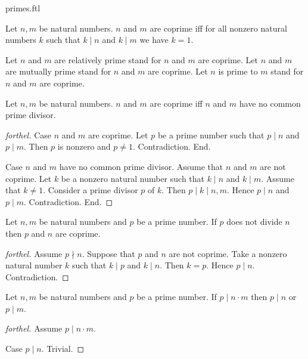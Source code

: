 \documentclass{naproche-library}
\begin{document}
\begin{smodule}[title=Prime Numbers]{primes.ftl}
\begin{definition}[forthel,id=ARITHMETIC_10_463197419077632]
  Let $n, m$ be natural numbers.
  $n$ and $m$ are coprime iff for all nonzero natural numbers $k$ such that $k \mid n$ and $k \mid m$ we have $k = 1$.

  Let $n$ and $m$ are relatively prime stand for $n$ and $m$ are coprime.
  Let $n$ and $m$ are mutually prime stand for $n$ and $m$ are coprime.
  Let $n$ is prime to $m$ stand for $n$ and $m$ are coprime.
\end{definition}

\begin{proposition}[forthel,id=ARITHMETIC_10_5776394594287616]
  Let $n, m$ be natural numbers.
  $n$ and $m$ are coprime iff $n$ and $m$ have no common prime divisor.
\end{proposition}
\begin{proof}[forthel]
  Case $n$ and $m$ are coprime.
    Let $p$ be a prime number such that $p \mid n$ and $p \mid m$.
    Then $p$ is nonzero and $p \neq 1$.
    Contradiction.
  End.

  Case $n$ and $m$ have no common prime divisor.
    Assume that $n$ and $m$ are not coprime.
    Let $k$ be a nonzero natural number such that $k \mid n$ and $k \mid m$.
    Assume that $k \neq 1$.
    Consider a prime divisor $p$ of $k$.
    Then $p \mid k \mid n,m$.
    Hence $p \mid n$ and $p \mid m$.
    Contradiction.
  End.
\end{proof}

\begin{proposition}[forthel,id=ARITHMETIC_10_7212152851005440]
  Let $n, m$ be natural numbers and $p$ be a prime number.
  If $p$ does not divide $n$ then $p$ and $n$ are coprime.
\end{proposition}
\begin{proof}[forthel]
  Assume $p \nmid n$.
  Suppose that $p$ and $n$ are not coprime.
  Take a nonzero natural number $k$ such that $k \mid p$ and $k \mid n$.
  Then $k = p$.
  Hence $p \mid n$.
  Contradiction.
\end{proof}

\begin{proposition}[forthel,id=ARITHMETIC_10_8313676557713408]
  Let $n, m$ be natural numbers and $p$ be a prime number.
  If $p \mid n \cdot m$ then $p \mid n$ or $p \mid m$.
\end{proposition}
\begin{proof}[forthel]
  Assume $p \mid n \cdot m$.

  Case $p \mid n$. Trivial.


\end{proof}
\end{smodule}
\end{document}
